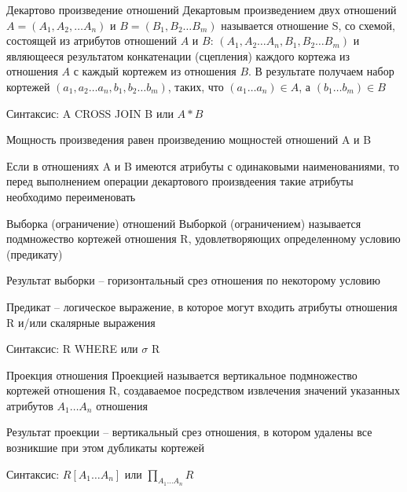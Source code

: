 \documentclass[12pt]{article}
\begin{document}
\begin{defin}{Декартово произведение отношений}
    Декартовым произведением двух отношений $A = (A_1, A_2, \ldots A_n)$ и $B = (B_1, B_2 \ldots B_m)$ называется отношение S, со схемой, состоящей из атрибутов отношений $A$ и $B$: $(A_1, A_2 \ldots A_n, B_1, B_2 \ldots B_m)$ и являющееся результатом конкатенации (сцепления) каждого кортежа из отношения $A$ с каждый кортежем из отношения $B$. В результате получаем набор кортежей $(a_1, a_2 \ldots a_n, b_1, b_2 \ldots b_m)$, таких, что $(a_1 \ldots a_n) \in A$, а $(b_1 \ldots b_m) \in B$

    Синтаксис: A CROSS JOIN B или $A * B$

    \begin{Remark}{}
        Мощность произведения равен произведению мощностей отношений A и B 

        Если в отношениях A и B имеются атрибуты с одинаковыми наименованиями, то перед выполнением операции декартового произвдеения такие атрибуты необходимо переименовать 
    \end{Remark}
\end{defin}

\begin{defin}{Выборка (ограничение) отношений}
    Выборкой (ограничением) называется подмножество кортежей отношения R, удовлетворяющих определенному условию (предикату)

    Результат выборки -- горизонтальный срез отношения по некоторому условию

    Предикат -- логическое выражение, в которое могут входить атрибуты отношения R и/или скалярные выражения 

    Синтаксис: R WHERE или $\sigma$ R
\end{defin}

\begin{defin}{Проекция отношения}
    Проекцией называется вертикальное подмножество кортежей отношения R, создаваемое посредством извлечения значений указанных атрибутов $A_1 \ldots A_n$ отношения 

    Результат проекции -- вертикальный срез отношения, в котором удалены все возникшие при этом дубликаты кортежей 

    Синтаксис: $R[A_1 \ldots A_n]$ или $\prod_{A_1 \ldots A_n} R$
\end{defin}
\end{document}
